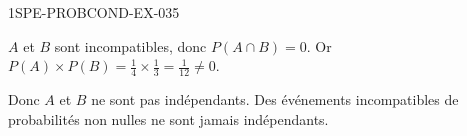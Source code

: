 \begin{corrige}{1SPE-PROBCOND-EX-035}

$A$ et $B$ sont incompatibles, donc $P(A \cap B) = 0$. Or $P(A) \times P(B) = \frac{1}{4} \times \frac{1}{3} = \frac{1}{12}
\neq 0$.

Donc $A$ et $B$ ne sont pas indépendants. Des événements incompatibles de probabilités non nulles ne sont jamais indépendants.

\end{corrige}

